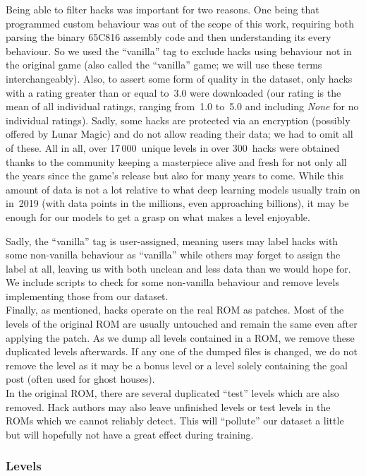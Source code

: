 Being able to filter hacks was important for two reasons. One being
that programmed custom behaviour was out of the scope of this work,
requiring both parsing the binary 65C816 assembly code and then
understanding its every behaviour. So we used the ``vanilla'' tag to
exclude hacks using behaviour not in the original game (also called
the ``vanilla'' game; we will use these terms interchangeably). 
Also, to assert some form of quality in the dataset, only hacks with a
rating greater than or equal to~3.0 were downloaded (our rating is the
mean of all individual ratings, ranging from~1.0 to~5.0 and including
\emph{None} for no individual ratings). Sadly, some hacks are
protected via an encryption (possibly offered by Lunar Magic) and do
not allow reading their data; we had to omit all of these. All in all,
over 17\,000~unique levels in over 300~hacks were obtained thanks to
the community keeping a masterpiece alive and fresh for not only all
the years since the game's release but also for many years to come.
While this amount of data is not a lot relative to what deep learning
models usually train on in~2019 (with data points in the millions,
even approaching billions), it may be enough for our models to get a
grasp on what makes a level enjoyable.

Sadly, the ``vanilla'' tag is user-assigned, meaning users may label
hacks with some non-vanilla behaviour as ``vanilla'' while others may
forget to assign the label at all, leaving us with both unclean and
less data than we would hope for. We include scripts to check for some
non-vanilla behaviour and remove levels implementing those from our
dataset. \\
Finally, as mentioned, hacks operate on the real ROM as patches. Most
of the levels of the original ROM are usually untouched and remain the
same even after applying the patch. As we dump all levels contained in
a ROM, we remove these duplicated levels afterwards. If any one of the
dumped files is changed, we do not remove the level as it may be a
bonus level or a level solely containing the goal post (often used for
ghost houses). \\
In the original ROM, there are several duplicated ``test'' levels
which are also removed. Hack authors may also leave unfinished levels
or test levels in the ROMs which we cannot reliably detect. This will
``pollute'' our dataset a little but will hopefully not have a great
effect during training.

\subsubsection{Levels}
\label{sec:levels}

